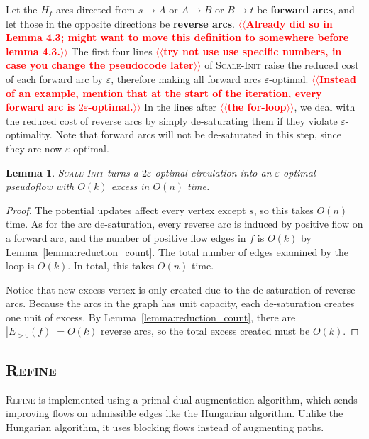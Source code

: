 \documentclass[11pt]{article}
\makeatletter
\def\eps{\varepsilon}
\theoremstyle{plain}
\newtheorem{lemma}{Lemma}[section]
\numberwithin{figure}{section}
\def\EMPH#1{\textbf{\boldmath #1}}
\def\n@te#1{\textsf{\boldmath \textbf{$\langle\!\langle$#1$\rangle\!\rangle$}}\leavevmode}
\def\note#1{\textcolor{red}{\n@te{#1}}}
\makeatother
\begin{document}
Let the $H_f$ arcs directed from $s \to A$ or $A \to B$ or $B \to t$ be
\EMPH{forward arcs}, and let those in the opposite directions be
\EMPH{reverse arcs}.
\note{Already did so in Lemma 4.3; might want to move this definition to somewhere before lemma 4.3.}
The first four lines \note{try not use use specific numbers, in case you change the pseudocode later} of \textsc{Scale-Init} raise the reduced cost of each
forward arc by $\eps$, therefore making all forward arcs $\eps$-optimal.
\note{Instead of an example, mention that at the start of the iteration, every forward arc is $2\eps$-optimal.}
In the lines after \note{the for-loop}, we deal with the reduced cost of reverse arcs by simply
de-saturating them if they violate $\eps$-optimality.
Note that forward arcs will not be de-saturated in this step, since they are
now $\eps$-optimal.

\begin{lemma}
\label{lemma:scale_init}
\textsc{Scale-Init} turns a $2\eps$-optimal circulation into an
$\eps$-optimal pseudoflow with $O(k)$ excess in $O(n)$ time.
\end{lemma}

\begin{proof}
The potential updates affect every vertex except $s$, so this takes $O(n)$
time.
As for the arc de-saturation, every reverse arc is induced by positive flow on
a forward arc, and the number of positive flow edges in $f$ is $O(k)$ by
Lemma~\ref{lemma:reduction_count}.
The total number of edges examined by the loop is $O(k)$.
In total, this takes $O(n)$ time.

Notice that new excess vertex is only created due to the
de-saturation of reverse arcs.
Because the arcs in the graph has unit capacity, each de-saturation creates one unit of
excess.
By Lemma~\ref{lemma:reduction_count}, there are $|E_{>0}(f)| = O(k)$ reverse
arcs, so the total excess created must be $O(k)$.
\end{proof}


\subsection{\textsc{Refine}}

\textsc{Refine} is implemented using a primal-dual augmentation algorithm,
which sends improving flows on admissible edges like the Hungarian algorithm.
Unlike the Hungarian algorithm, it uses blocking flows instead of augmenting
paths.
\end{document}
